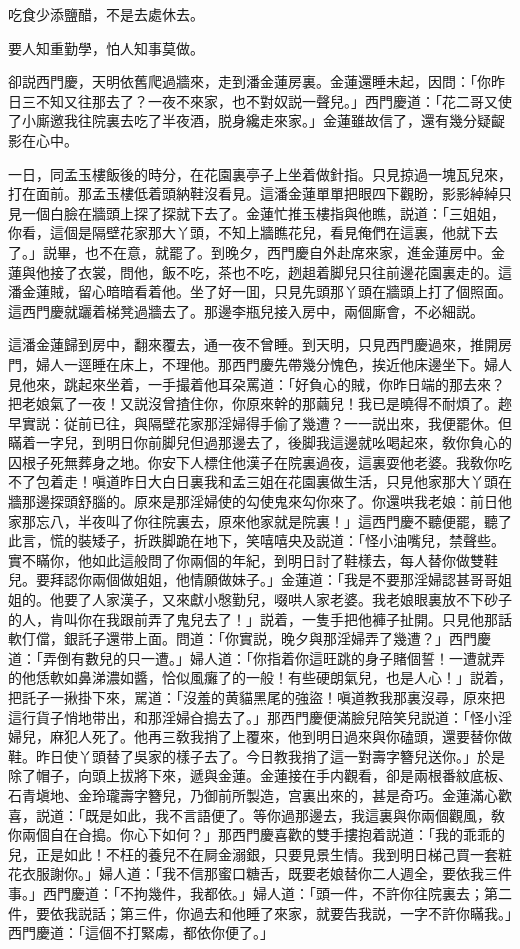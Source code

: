 \begin{myquote}
吃食少添鹽醋，不是去處休去。

要人知重勤學，怕人知事莫做。
\end{myquote}

卻説西門慶，天明依舊爬過牆來，走到潘金蓮房裏。金蓮還睡未起，因問：「你昨日三不知又往那去了？一夜不來家，也不對奴説一聲兒。」西門慶道：「花二哥又使了小廝邀我往院裏去吃了半夜酒，脱身纔走來家。」金蓮雖故信了，還有幾分疑齪影在心中。

一日，同孟玉樓飯後的時分，在花園裏亭子上坐着做針指。只見掠過一塊瓦兒來，打在面前。那孟玉樓低着頭納鞋沒看見。這潘金蓮單單把眼四下觀盼，影影綽綽只見一個白臉在牆頭上探了探就下去了。金蓮忙推玉樓指與他瞧，説道：「三姐姐，你看，這個是隔壁花家那大丫頭，不知上牆瞧花兒，看見俺們在這裏，他就下去了。」説畢，也不在意，就罷了。到晚夕，西門慶自外赴席來家，進金蓮房中。金蓮與他接了衣裳，問他，飯不吃，茶也不吃，趔趄着脚兒只往前邊花園裏走的。這潘金蓮賊，留心暗暗看着他。坐了好一囬，只見先頭那丫頭在牆頭上打了個照面。這西門慶就躧着梯凳過牆去了。那邊李瓶兒接入房中，兩個廝會，不必細説。

這潘金蓮歸到房中，翻來覆去，通一夜不曾睡。到天明，只見西門慶過來，推開房門，婦人一逕睡在床上，不理他。那西門慶先帶幾分愧色，挨近他床邊坐下。婦人見他來，跳起來坐着，一手撮着他耳朶罵道：「好負心的賊，你昨日端的那去來？把老娘氣了一夜！又説沒曾揸住你，你原來幹的那繭兒！我已是曉得不耐煩了。趂早實説：従前已往，與隔壁花家那淫婦得手偷了幾遭？一一説出來，我便罷休。但瞞着一字兒，到明日你前脚兒但過那邊去了，後脚我這邊就吆喝起來，敎你負心的囚根子死無葬身之地。你安下人標住他漢子在院裏過夜，這裏耍他老婆。我敎你吃不了包着走！嗔道昨日大白日裏我和孟三姐在花園裏做生活，只見他家那大丫頭在牆那邊探頭舒腦的。原來是那淫婦使的勾使鬼來勾你來了。你還哄我老娘：前日他家那忘八，半夜叫了你往院裏去，原來他家就是院裏！」這西門慶不聽便罷，聽了此言，慌的裝矮子，折跌脚跪在地下，笑嘻嘻央及説道：「怪小油嘴兒，禁聲些。實不瞞你，他如此這般問了你兩個的年紀，到明日討了鞋樣去，每人替你做雙鞋兒。要拜認你兩個做姐姐，他情願做妹子。」金蓮道：「我是不要那淫婦認甚哥哥姐姐的。他要了人家漢子，又來獻小慇勤兒，啜哄人家老婆。我老娘眼裏放不下砂子的人，肯叫你在我跟前弄了鬼兒去了！」説着，一隻手把他褲子扯開。只見他那話軟仃儅，銀託子還带上面。問道：「你實説，晚夕與那淫婦弄了幾遭？」西門慶道：「弄倒有數兒的只一遭。」婦人道：「你指着你這旺跳的身子賭個誓！一遭就弄的他恁軟如鼻涕濃如醬，恰似風癱了的一般！有些硬朗氣兒，也是人心！」説着，把託子一揪掛下來，駡道：「沒羞的黄貓黑尾的強盜！嗔道教我那裏沒尋，原來把這行貨子悄地带出，和那淫婦㒲搗去了。」那西門慶便滿臉兒陪笑兒説道：「怪小淫婦兒，麻犯人死了。他再三敎我捎了上覆來，他到明日過來與你磕頭，還要替你做鞋。昨日使丫頭替了吳家的樣子去了。今日教我捎了這一對壽字簪兒送你。」於是除了帽子，向頭上拔將下來，遞與金蓮。金蓮接在手内觀看，卻是兩根番紋底板、石青塡地、金玲瓏壽字簪兒，乃御前所製造，宫裏出來的，甚是奇巧。金蓮滿心歡喜，説道：「既是如此，我不言語便了。等你過那邊去，我這裏與你兩個觀風，敎你兩個自在㒲搗。你心下如何？」那西門慶喜歡的雙手摟抱着説道：「我的乖乖的兒，正是如此！不枉的養兒不在屙金溺銀，只要見景生情。我到明日梯己買一套粧花衣服謝你。」婦人道：「我不信那蜜口糖舌，既要老娘替你二人週全，要依我三件事。」西門慶道：「不拘幾件，我都依。」婦人道：「頭一件，不許你往院裏去；第二件，要依我説話；第三件，你過去和他睡了來家，就要告我説，一字不許你瞞我。」西門慶道：「這個不打緊䖏，都依你便了。」

